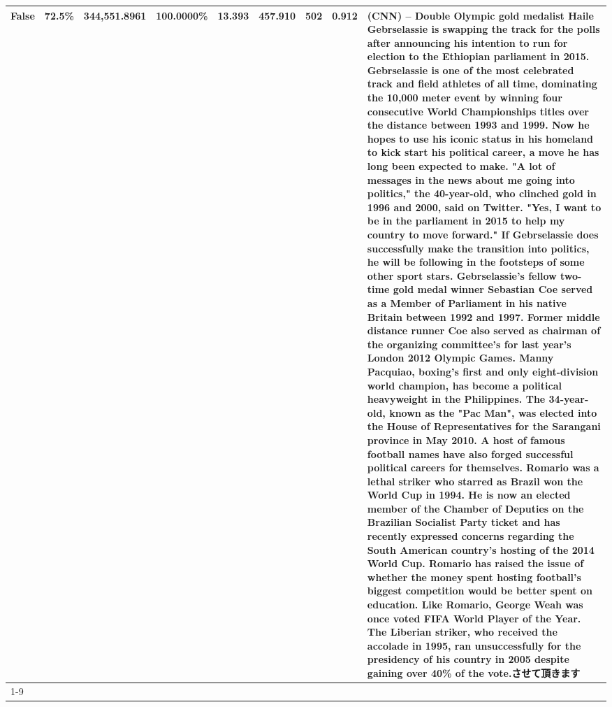 \begin{table}[H]
{\begin{tabular}{lllrlllll}
False & 72.5\% & 344,551.8961 & \bfseries \color{red} 100.0000\% & 13.393 & 457.910 & 502 & 0.912 & (CNN) -- Double Olympic gold medalist Haile Gebrselassie is swapping the track for the polls after announcing his intention to run for election to the Ethiopian parliament in 2015. Gebrselassie is one of the most celebrated track and field athletes of all time, dominating the 10,000 meter event by winning four consecutive World Championships titles over the distance between 1993 and 1999. Now he hopes to use his iconic status in his homeland to kick start his political career, a move he has long been expected to make. "A lot of messages in the news about me going into politics," the 40-year-old, who clinched gold in 1996 and 2000, said on Twitter. "Yes, I want to be in the parliament in 2015 to help my country to move forward." If Gebrselassie does successfully make the transition into politics, he will be following in the footsteps of some other sport stars. Gebrselassie's fellow two-time gold medal winner Sebastian Coe served as a Member of Parliament in his native Britain between 1992 and 1997. Former middle distance runner Coe also served as chairman of the organizing committee's for last year's London 2012 Olympic Games. Manny Pacquiao, boxing's first and only eight-division world champion, has become a political heavyweight in the Philippines. The 34-year-old, known as the "Pac Man", was elected into the House of Representatives for the Sarangani province in May 2010. A host of famous football names have also forged successful political careers for themselves. Romario was a lethal striker who starred as Brazil won the World Cup in 1994. He is now an elected member of the Chamber of Deputies on the Brazilian Socialist Party ticket and has recently expressed concerns regarding the South American country's hosting of the 2014 World Cup. Romario has raised the issue of whether the money spent hosting football's biggest competition would be better spent on education. Like Romario, George Weah was once voted FIFA World Player of the Year. The Liberian striker, who received the accolade in 1995, ran unsuccessfully for the presidency of his country in 2005 despite gaining over 40\% of the vote.させて頂きます \\
\cline{1-9}

\end{tabular}}
\end{table}

